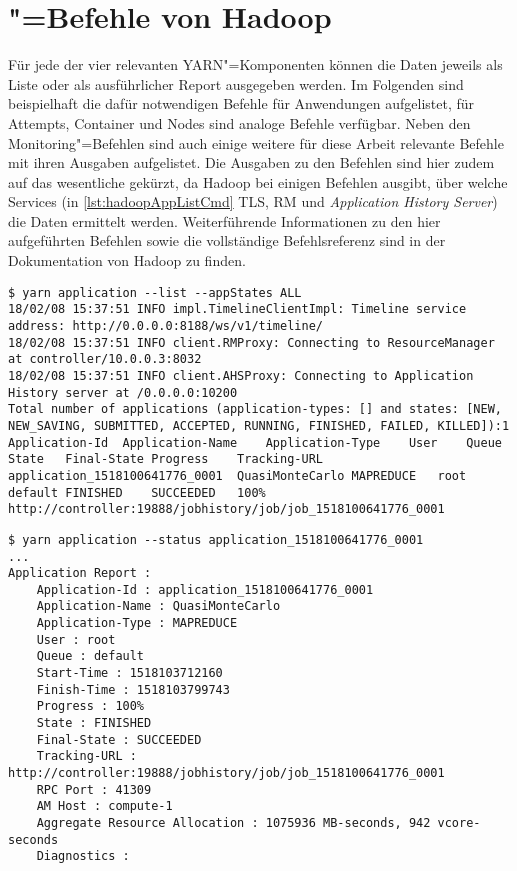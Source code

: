 \chapter{"=Befehle von Hadoop}
\label{app:hadoopCmds}

Für jede der vier relevanten YARN"=Komponenten können die Daten jeweils als Liste oder als ausführlicher Report ausgegeben werden.
Im Folgenden sind beispielhaft die dafür notwendigen Befehle für Anwendungen aufgelistet, für Attempts, Container und Nodes sind analoge Befehle verfügbar.
Neben den Monitoring"=Befehlen sind auch einige weitere für diese Arbeit relevante Befehle mit ihren Ausgaben aufgelistet.
Die Ausgaben zu den Befehlen sind hier zudem auf das wesentliche gekürzt, \uA da Hadoop bei einigen Befehlen ausgibt, über welche Services (in \cref{lst:hadoopAppListCmd} \zB \gls{TLS}, \gls{RM} und \emph{Application History Server}) die Daten ermittelt werden.
Weiterführende Informationen zu den hier aufgeführten Befehlen sowie die vollständige Befehlsreferenz sind in der Dokumentation von Hadoop \cite{HadoopYarnCmds271} zu finden.

\begin{lstlisting}[label=lst:hadoopAppListCmd,style=plain,
caption={[\glsentryshort{CLI}"=Ausgabe der Anwendungsliste]
    \acrshort{CLI}"=Ausgabe der Anwendungsliste.
    Anwendungen können mithilfe der Optionen \mbox{\texttt{-{}-appTypes}} und \mbox{\texttt{-{}-appStates}} gefiltert werden.}]
$ yarn application --list --appStates ALL
18/02/08 15:37:51 INFO impl.TimelineClientImpl: Timeline service address: http://0.0.0.0:8188/ws/v1/timeline/
18/02/08 15:37:51 INFO client.RMProxy: Connecting to ResourceManager at controller/10.0.0.3:8032
18/02/08 15:37:51 INFO client.AHSProxy: Connecting to Application History server at /0.0.0.0:10200
Total number of applications (application-types: [] and states: [NEW, NEW_SAVING, SUBMITTED, ACCEPTED, RUNNING, FINISHED, FAILED, KILLED]):1
Application-Id	Application-Name	Application-Type	User	Queue	State	Final-State	Progress	Tracking-URL
application_1518100641776_0001	QuasiMonteCarlo	MAPREDUCE	root	default	FINISHED	SUCCEEDED	100%	http://controller:19888/jobhistory/job/job_1518100641776_0001
\end{lstlisting}

\begin{lstlisting}[label=lst:hadoopAppDetailsCmd,style=plain,
caption={[\glsentryshort{CLI}"=Ausgabe des Reports einer Anwendung]
    \acrshort{CLI}"=Ausgabe des Reports einer Anwendung}]
$ yarn application --status application_1518100641776_0001
...
Application Report : 
    Application-Id : application_1518100641776_0001
    Application-Name : QuasiMonteCarlo
    Application-Type : MAPREDUCE
    User : root
    Queue : default
    Start-Time : 1518103712160
    Finish-Time : 1518103799743
    Progress : 100%
    State : FINISHED
    Final-State : SUCCEEDED
    Tracking-URL : http://controller:19888/jobhistory/job/job_1518100641776_0001
    RPC Port : 41309
    AM Host : compute-1
    Aggregate Resource Allocation : 1075936 MB-seconds, 942 vcore-seconds
    Diagnostics :
\end{lstlisting}

